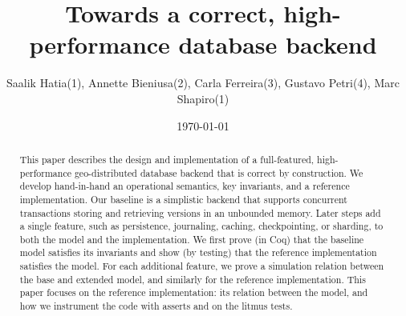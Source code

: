 \documentclass[systeme,french,english]{compas2022}
\begin{document}

\title{Towards a correct, high-performance database backend}

\author{Saalik Hatia(1), Annette Bieniusa(2), Carla Ferreira(3), Gustavo Petri(4), Marc Shapiro(1)}


\address{
  (1)~LIP6--Sorbonne-Université \& Inria, Paris, France  \\
  (2)~TU Kaiserslautern, Germany \\
  (3)~Universidade NOVA de Lisboa, Portugal \\
  (4)~ARM, Cambridge, United Kingdom\\
  }

\date{\today}

\maketitle

\begin{abstract}
  This paper describes the design and implementation of a full-featured,
  high-performance geo-distributed database backend that is correct by
  construction.
  We develop hand-in-hand an operational semantics, key
  invariants, and a reference implementation.
  Our baseline is a simplistic backend that supports concurrent
  transactions storing and retrieving versions in an unbounded memory.
  Later steps add a single feature, such as persistence, journaling,
  caching, checkpointing, or sharding, to both the model and the
  implementation.
  We first prove (in Coq) that the baseline model satisfies its
  invariants and show (by testing) that the reference implementation
  satisfies the model.
  For each additional feature, we prove a simulation relation between
  the base and extended model, and similarly for the reference
  implementation.
  This paper focuses on the reference implementation: its relation
  between the model, and how we instrument the code with asserts and on
  the litmus tests.

\end{abstract}
\end{document}
